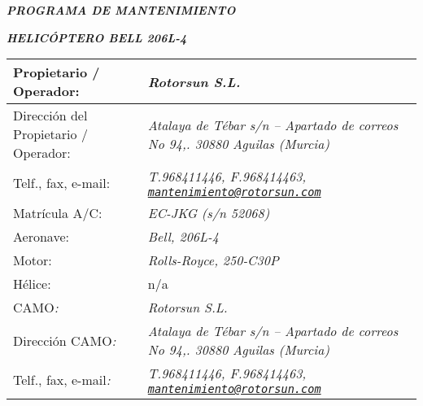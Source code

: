 \documentclass[
]{article}
\author{}
\date{}
\begin{document}
\emph{\textbf{PROGRAMA DE MANTENIMIENTO}}

\emph{\textbf{HELICÓPTERO BELL 206L-4}}

\begin{longtable}[]{@{}
  >{\raggedright\arraybackslash}p{}
  >{\raggedright\arraybackslash}p{}@{}}
\toprule\noalign{}
\endhead
\bottomrule\noalign{}
\endlastfoot
Propietario / Operador: & \emph{Rotorsun S.L.} \\
\hline
Dirección del Propietario / Operador: & \emph{Atalaya de Tébar s/n --
Apartado de correos No 94,. 30880 Aguilas (Murcia)} \\
\hline
Telf., fax, e-mail: & \emph{T.968411446, F.968414463,
\href{mailto:mantenimiento@rotorsun.com}{\nolinkurl{mantenimiento@rotorsun.com}}} \\
\hline
Matrícula A/C: & \emph{EC-JKG (s/n 52068)} \\
\hline
Aeronave: & \emph{Bell, 206L-4} \\
\hline
Motor: & \emph{Rolls-Royce, 250-C30P} \\
\hline
Hélice: & n/a \\
\hline
CAMO\emph{:} & \emph{Rotorsun S.L.} \\
\hline
Dirección CAMO\emph{:} & \emph{Atalaya de Tébar s/n -- Apartado de
correos No 94,. 30880 Aguilas (Murcia)} \\
\hline
Telf., fax, e-mail\emph{:} & \emph{T.968411446, F.968414463,
\href{mailto:mantenimiento@rotorsun.com}{\nolinkurl{mantenimiento@rotorsun.com}}} \\
\end{longtable}

\newpage

\textbf{\hfill\break
}
\end{document}
